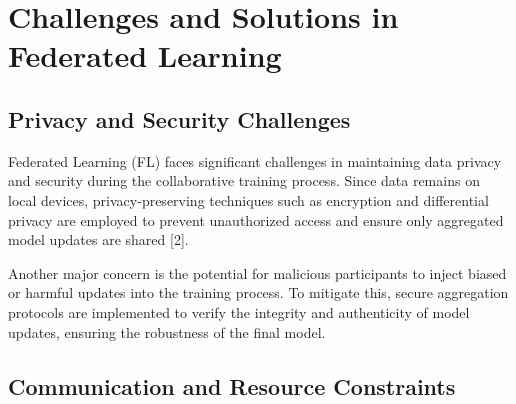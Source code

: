 \section{Challenges and Solutions in Federated Learning}
\subsection{Privacy and Security Challenges}

Federated Learning (FL) faces significant challenges in maintaining data privacy and security during the collaborative training process. Since data remains on local devices, privacy-preserving techniques  such as encryption and differential privacy  are employed to prevent unauthorized access and ensure only aggregated model updates are shared [2].

Another major concern is the potential for malicious participants to inject biased or harmful updates into the training process. To mitigate this, secure aggregation protocols are implemented to verify the integrity and authenticity of model updates, ensuring the robustness of the final model.

 

\subsection{Communication and Resource Constraints}

